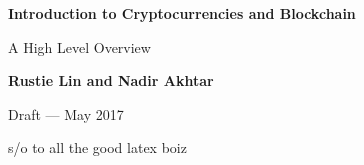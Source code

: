 \documentclass[full.tex]{subfiles}
\begin{document}
    
\begin{titlepage}
    \begin{center}
        \vspace*{1cm}
        
        \textbf{\huge Introduction to Cryptocurrencies and Blockchain}
        
        \vspace{0.5cm}
        {\LARGE A High Level Overview} 
        
        \vspace{1.5cm}
        
        \textbf{Rustie Lin and Nadir Akhtar}
        
        Draft --- May 2017 %
        
        \vfill
        
        s/o to all the good latex boiz 
        
        
        \vspace{0.8cm}
        
        
        
        
        
        
    \end{center}
\end{titlepage}
    
    
\end{document}
